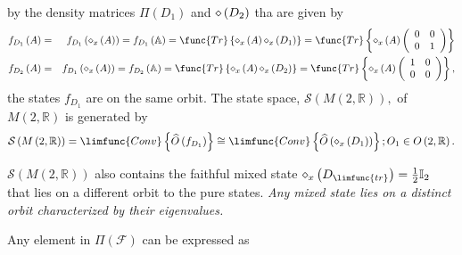 \documentclass[aps,preprint]{revtex4}
\begin{document}
by the density matrices $\mathcal{\Pi }\left( D_{1}\right) $ and $\mathcal{%
\Pi }\left( D_{2}\right) $ tha are given by 
\begin{eqnarray}
f_{D_{1}}\left( A\right) &=&f_{D_{1}}\left( \mathcal{\Pi }_{x}\left(
A\right) \right) =f_{D_{1}}\left( \mathbb{A}\right) =\func{Tr}\left\{ 
\mathcal{\Pi }_{x}\left( A\right) \mathcal{\Pi }_{x}\left( D_{1}\right)
\right\} =\func{Tr}\left\{ \mathcal{\Pi }_{x}\left( A\right) \left( 
\begin{array}{cc}
0 & 0 \\ 
0 & 1%
\end{array}%
\right) \right\} \\
f_{D_{2}}\left( A\right) &=&f_{D_{1}}\left( \mathcal{\Pi }_{x}\left(
A\right) \right) =f_{D_{2}}\left( \mathbb{A}\right) =\func{Tr}\left\{ 
\mathcal{\Pi }_{x}\left( A\right) \mathcal{\Pi }_{x}\left( D_{2}\right)
\right\} =\func{Tr}\left\{ \mathcal{\Pi }_{x}\left( A\right) \left( 
\begin{array}{cc}
1 & 0 \\ 
0 & 0%
\end{array}%
\right) \right\} ,
\end{eqnarray}%
the states $f_{D_{1}}$ are on the same orbit. The state space, $\mathcal{S}%
\left( M\left( 2,\mathbb{R}\right) \right) ,$ of $M\left( 2,\mathbb{R}%
\right) $ is generated by 
\begin{equation}
\mathcal{S}\left( M\left( 2,\mathbb{R}\right) \right) =\limfunc{Conv}\left\{ 
\widehat{O}\left( f_{D_{1}}\right) \right\} \cong \limfunc{Conv}\left\{ 
\widehat{O}\left( \mathcal{\Pi }_{x}\left( D_{1}\right) \right) \right\}
;O_{1}\in O\left( 2,\mathbb{R}\right) .
\end{equation}

$\mathcal{S}\left( M\left( 2,\mathbb{R}\right) \right) $ also contains the
faithful mixed state $\mathcal{\Pi }_{x}\left( D_{\limfunc{tr}}\right) =%
\frac{1}{2}\mathbb{I}_{2}$ that lies on a different orbit to the pure
states. \emph{Any mixed state lies on a distinct orbit characterized by
their eigenvalues.}

Any element in $\mathcal{\Pi }\left( \mathcal{F}\right) $ can be expressed as
\end{document}
